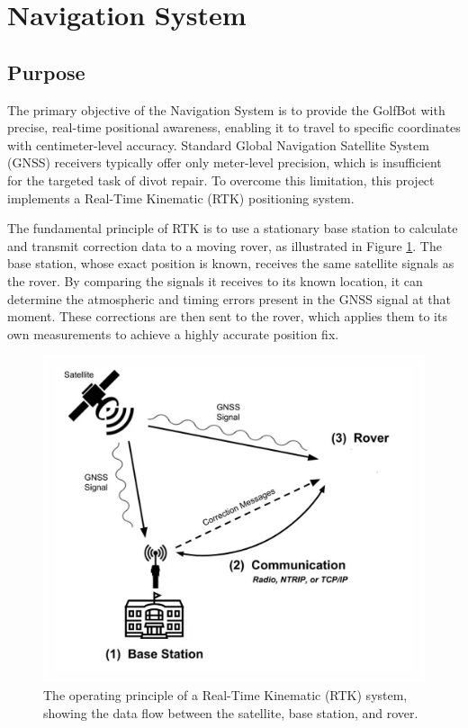 \section{Navigation System}
\label{sec:nav_implementation}

\subsection{Purpose}
\label{ssec:nav_intro}
The primary objective of the Navigation System is to provide the GolfBot with precise, real-time positional awareness, enabling it to travel to specific coordinates with centimeter-level accuracy. Standard Global Navigation Satellite System (GNSS) receivers typically offer only meter-level precision, which is insufficient for the targeted task of divot repair. To overcome this limitation, this project implements a Real-Time Kinematic (RTK) positioning system.

The fundamental principle of RTK is to use a stationary base station to calculate and transmit correction data to a moving rover, as illustrated in Figure \ref{fig:rtk_concept}. The base station, whose exact position is known, receives the same satellite signals as the rover. By comparing the signals it receives to its known location, it can determine the atmospheric and timing errors present in the GNSS signal at that moment. These corrections are then sent to the rover, which applies them to its own measurements to achieve a highly accurate position fix.

\begin{figure}[h!]
    \centering
    \includegraphics[width=0.8\linewidth]{figures/rtk.PNG}
    \caption{The operating principle of a Real-Time Kinematic (RTK) system, showing the data flow between the satellite, base station, and rover.}
    \label{fig:rtk_concept}
\end{figure}

